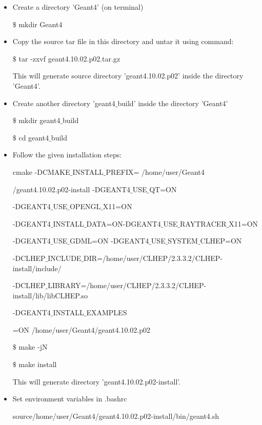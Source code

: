 \begin{itemize}
	\item Create a directory 'Geant4' (on terminal)
	
	$\$$ mkdir Geant4
	
	\item Copy the source tar file in this directory and untar it using command:
	
	$\$$ tar -zxvf geant4.10.02.p02.tar.gz                 
	
	This will generate source directory 'geant4.10.02.p02' inside the directory 'Geant4'.
	
	\item Create another directory 'geant4$\_$build' inside the directory 'Geant4'
	
	$\$$ mkdir geant4$\_$build                                               
	
	$\$$ cd geant4$\_$build
	
	\item Follow the given installation steps:
	
	cmake -DCMAKE$\_$INSTALL$\_$PREFIX= /home/user/Geant4
	
	/geant4.10.02.p02-install -DGEANT4$\_$USE$\_$QT=ON
	
	-DGEANT4$\_$USE$\_$OPENGL$\_$X11=ON 
	
	-DGEANT4$\_$INSTALL$\_$DATA=ON-DGEANT4$\_$USE$\_$RAYTRACER$\_$X11=ON 
	
	-DGEANT4$\_$USE$\_$GDML=ON  -DGEANT4$\_$USE$\_$SYSTEM$\_$CLHEP=ON 
	
	-DCLHEP$\_$INCLUDE$\_$DIR=/home/user/CLHEP/2.3.3.2/CLHEP-install/include/
	
	-DCLHEP$\_$LIBRARY=/home/user/CLHEP/2.3.3.2/CLHEP-install/lib/libCLHEP.so 
	
	-DGEANT4$\_$INSTALL$\_$EXAMPLES
	
	=ON /home/user/Geant4/geant4.10.02.p02 
	
	$\$$ make -jN   
	
	$\$$ make install
	
	This will generate directory 'geant4.10.02.p02-install'.
	
	\item Set environment variables in .bashrc                                                                            
	
	source/home/user/Geant4/geant4.10.02.p02-install/bin/geant4.sh
	
\end{itemize}

